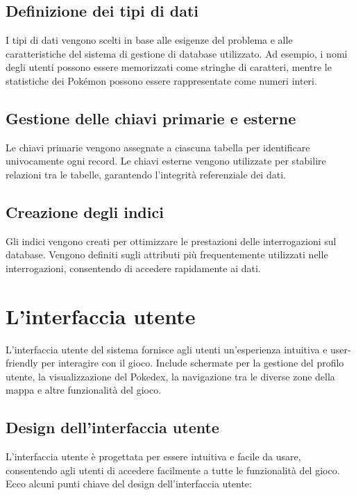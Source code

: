\documentclass{article}
\begin{document}
\subsection{Definizione dei tipi di dati}

I tipi di dati vengono scelti in base alle esigenze del problema e alle caratteristiche del sistema di gestione di database utilizzato. Ad esempio, i nomi degli utenti possono essere memorizzati come stringhe di caratteri, mentre le statistiche dei Pokémon possono essere rappresentate come numeri interi.

\subsection{Gestione delle chiavi primarie e esterne}

Le chiavi primarie vengono assegnate a ciascuna tabella per identificare univocamente ogni record. Le chiavi esterne vengono utilizzate per stabilire relazioni tra le tabelle, garantendo l'integrità referenziale dei dati.

\subsection{Creazione degli indici}

Gli indici vengono creati per ottimizzare le prestazioni delle interrogazioni sul database. Vengono definiti sugli attributi più frequentemente utilizzati nelle interrogazioni, consentendo di accedere rapidamente ai dati.

\section{L'interfaccia utente}

L'interfaccia utente del sistema fornisce agli utenti un'esperienza intuitiva e user-friendly per interagire con il gioco. Include schermate per la gestione del profilo utente, la visualizzazione del Pokedex, la navigazione tra le diverse zone della mappa e altre funzionalità del gioco.

\subsection{Design dell'interfaccia utente}

L'interfaccia utente è progettata per essere intuitiva e facile da usare, consentendo agli utenti di accedere facilmente a tutte le funzionalità del gioco. Ecco alcuni punti chiave del design dell'interfaccia utente:
\end{document}
